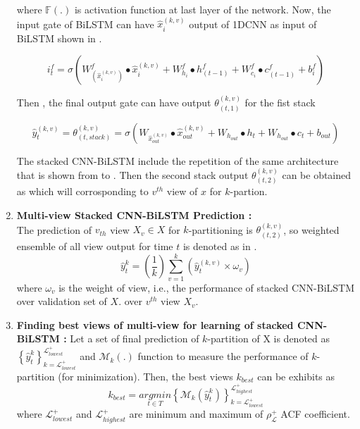 \documentclass[a4paper, fleqn]{cas-sc}
\theoremstyle{definition}
\theoremstyle{remark}
\begin{document}
\begin{enumerate}[label=(\alph*)]
where $\mathbb{F}(.)$ is activation function at last layer of the network. Now,  the input gate of BiLSTM can have $\hat{x}_i^{(k, v)}$ output of 1DCNN as input of BiLSTM shown in .

\begin{equation}
\label{si}
  i_t^f = \sigma \left(W_{\left(\hat{x}_i^{(k, v)} \right)}^f  \bullet \hat{x}_i^{(k, v)} +W_{h_i}^f \bullet h_{(t-1)}^f +W_{c_i}^f \bullet c_{(t-1)}^f +b_i^f \right)
\end{equation}

Then ,  the final output gate can have output $\theta _{(t, 1)}^{(k, v)}$ for the fist stack

\begin{equation} \label{thi fin}
  \hat{y}_t^{(k, v)}=\theta _{(t, stack)}^{(k, v)}= \sigma \left(W_{\hat{x}_{out}^{(k, v)}} \bullet \hat{x}_{out}^{(k, v)} +  W_{h_{out}} \bullet h_t +W_{h_{out}} \bullet c_t +b_{out} \right)
\end{equation}

The stacked CNN-BiLSTM include the repetition of the same architecture that is shown from  to . Then the second stack output $\theta _{(t, 2)}^{(k, v)}$ can be obtained as  which will corrosponding  to $v^{th}$ view of $x$ for $k$-partion. 



  \item \textbf{Multi-view Stacked CNN-BiLSTM Prediction : }\\
  The prediction of $v_{th}$ view $X_v \in X$ for $k$-partitioning is $\theta_{(t, 2)}^{(k, v)} $, so weighted ensemble of all view output for time $t$ is denoted as in  .
  \begin{equation} \label{sta cb}
    \hat{y}_t^k= \left(\frac{1}{k} \right) \sum_{v=1}^{k} \left(\hat{y}_t^{(k, v)} \times \omega_v \right)
  \end{equation}
  where $\omega_v$ is the weight of view, i.e.,  the performance of stacked CNN-BiLSTM over validation set of $X$. over $v^{th}$ view $X_v$.



  \item \textbf{Finding best views of multi-view for learning of stacked CNN-BiLSTM : }
  Let a set of final prediction of $k$-partition of X is denoted as  $\left\{\hat{y}_t^k \right\}_{k=\mathscr{L}_{lowest}^+}^{\mathscr{L}_{lowest}^+}$ and $\mathcal{M}_k(.)$ function to measure the performance of $k$-partition (for minimization). Then,  the best views $k_{best}$ can be exhibits as 
  \begin{equation} \label{bv}
    k_{best}=\underset{t \in T}{arg min} \left\{\mathcal{M}_k \left(\hat{y}_t^k \right) \right\}_{k=\mathscr{L}_{lowest}^+}^{\mathscr{L}_{highest}^+}
  \end{equation}
  where $\mathscr{L}_{lowest}^+$ and $\mathscr{L}_{highest}^+$ are minimum and maximum of $\rho_{\mathscr{L}}^+$ ACF coefficient.

\end{enumerate}
\end{document}
